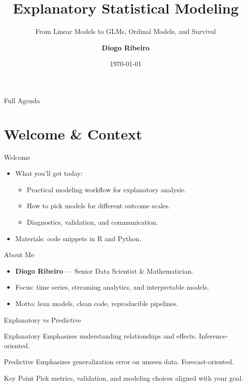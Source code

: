 \documentclass[aspectratio=169]{beamer}
\title[Explanatory Statistical Modeling]{Explanatory Statistical Modeling}
\subtitle{From Linear Models to GLMs, Ordinal Models, and Survival}
\author[Diogo Ribeiro]{\textbf{Diogo Ribeiro}}
\institute{Senior Data Scientist \& Mathematician}
\date{\today}
\begin{document}
\begin{frame}
  \titlepage
\end{frame}

\begin{frame}{Full Agenda}
  \tableofcontents
\end{frame}

\section{Welcome \& Context}

\begin{frame}{Welcome}
\begin{itemize}
  \item What you'll get today:
  \begin{itemize}
    \item Practical modeling workflow for explanatory analysis.
    \item How to pick models for different outcome scales.
    \item Diagnostics, validation, and communication.
  \end{itemize}
  \item Materials: code snippets in R and Python.
\end{itemize}
\end{frame}

\begin{frame}{About Me}
\begin{itemize}
  \item \textbf{Diogo Ribeiro} --- Senior Data Scientist \& Mathematician.
  \item Focus: time series, streaming analytics, and interpretable models.
  \item Motto: lean models, clean code, reproducible pipelines.
\end{itemize}
\end{frame}

\begin{frame}{Explanatory vs Predictive}
\begin{block}{Explanatory}
  Emphasizes understanding relationships and effects. Inference-oriented.
\end{block}
\begin{block}{Predictive}
  Emphasizes generalization error on unseen data. Forecast-oriented.
\end{block}
\begin{alertblock}{Key Point}
  Pick metrics, validation, and modeling choices aligned with your goal.
\end{alertblock}
\end{frame}
\end{document}
